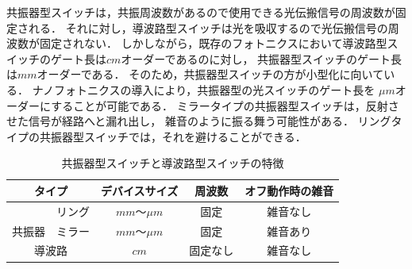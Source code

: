 共振器型スイッチは，共振周波数があるので使用できる光伝搬信号の周波数が固定される．
それに対し，導波路型スイッチは光を吸収するので光伝搬信号の周波数が固定されない．
しかしながら，既存のフォトニクスにおいて導波路型スイッチのゲート長は$cm$オーダーであるのに対し，
共振器型スイッチのゲート長は$mm$オーダーである．
そのため，共振器型スイッチの方が小型化に向いている．
ナノフォトニクスの導入により，共振器型の光スイッチのゲート長を
$ \mu m$オーダーにすることが可能である．
ミラータイプの共振器型スイッチは，反射させた信号が経路へと漏れ出し，
雑音のように振る舞う可能性がある．
リングタイプの共振器型スイッチでは，それを避けることができる．
\begin{table}[t]
        \begin{center}
        \caption{共振器型スイッチと導波路型スイッチの特徴}
        \begin{tabular}{|c|c|c|c|c|}\hline
        \multicolumn{2}{|c|}{タイプ}&デバイスサイズ&周波数&オフ動作時の雑音\\ \hline \hline
        &リング&$mm〜\mu m$&固定&雑音なし\\ \cline{2-5}
        共振器&ミラー&$mm〜\mu m$&固定&雑音あり\\ \hline
        \multicolumn{2}{|c|}{導波路}&$cm$&固定なし&雑音なし\\ \hline
        \end{tabular}
        \label{tab:debaisu}
        \end{center}
\end{table}
